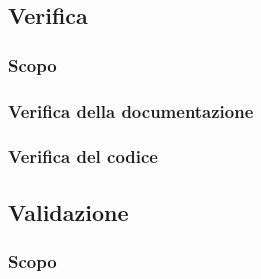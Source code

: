     \subsection{Verifica}
        \subsubsection{Scopo}
        
        \subsubsection{Verifica della documentazione}
        

        \subsubsection{Verifica del codice}
    
    \subsection{Validazione}
        \subsubsection{Scopo}
        